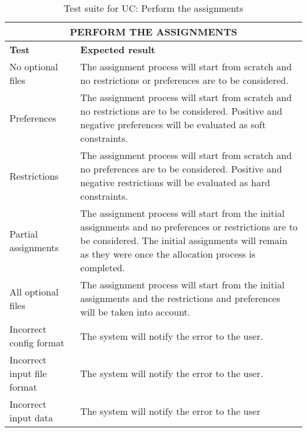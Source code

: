 \begin{table}[H]
    \centering
    \caption{Test suite for UC: Perform the assignments}
    \label{uc-table-assignments}
    \begin{tabular}{|p{4cm}|p{8cm}|}
        \hline
        \multicolumn{2}{|c|}{\textbf{PERFORM THE ASSIGNMENTS}} \\
        \hline
        \textbf{Test} & \textbf{Expected result} \\
        \rowcolor{blue!30}
        No optional files & The assignment process will start from scratch and no restrictions or preferences are to be considered. \\
        \rowcolor{blue!10}
        Preferences & The assignment process will start from scratch and no restrictions are to be considered. Positive and negative preferences will be evaluated as soft constraints. \\
        \rowcolor{blue!30}
        Restrictions & The assignment process will start from scratch and no preferences are to be considered. Positive and negative restrictions will be evaluated as hard constraints. \\
        \rowcolor{blue!10}
        Partial assignments & The assignment process will start from the initial assignments and no preferences or restrictions are to be considered. The initial assignments will remain as they were once the allocation process is completed. \\
        \rowcolor{blue!30}
        All optional files & The assignment process will start from the initial assignments and the restrictions and preferences will be taken into account. \\
        \rowcolor{blue!10}
        Incorrect config format & The system will notify the error to the user. \\
        \rowcolor{blue!30}
        Incorrect input file format & The system will notify the error to the user. \\
        \rowcolor{blue!10}
        Incorrect input data & The system will notify the error to the user \\
        \hline
    \end{tabular}
\end{table}


